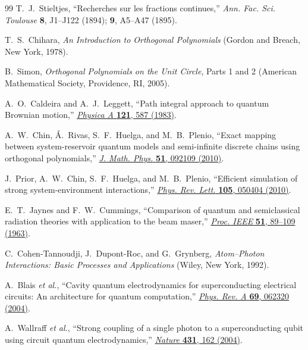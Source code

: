 \documentclass[reprint, floatfix, superscriptaddress, amsmath, amssymb, longbibliography]{revtex4-2}
\begin{document}
\begin{thebibliography}{99}
T.~J.~Stieltjes, ``Recherches sur les fractions continues,''
\textit{Ann. Fac. Sci. Toulouse} \textbf{8}, J1--J122 (1894);
\textbf{9}, A5--A47 (1895).

T.~S.~Chihara,
\textit{An Introduction to Orthogonal Polynomials}
(Gordon and Breach, New York, 1978).

B.~Simon,
\textit{Orthogonal Polynomials on the Unit Circle}, Parts 1 and 2
(American Mathematical Society, Providence, RI, 2005).

A.~O.~Caldeira and A.~J.~Leggett, ``Path integral approach to quantum Brownian motion,''
\href{https://doi.org/10.1016/0378-4371(83)90013-4}{\textit{Physica A} \textbf{121}, 587 (1983)}.

A.~W.~Chin, \'{A}.~Rivas, S.~F.~Huelga, and M.~B.~Plenio,
``Exact mapping between system-reservoir quantum models and semi-infinite discrete chains using orthogonal polynomials,''
\href{https://doi.org/10.1063/1.3490188}{\textit{J. Math. Phys.} \textbf{51}, 092109 (2010)}.

J.~Prior, A.~W.~Chin, S.~F.~Huelga, and M.~B.~Plenio,
``Efficient simulation of strong system-environment interactions,''
\href{https://doi.org/10.1103/PhysRevLett.105.050404}{\textit{Phys. Rev. Lett.} \textbf{105}, 050404 (2010)}.

E.~T.~Jaynes and F.~W.~Cummings, ``Comparison of quantum and semiclassical radiation theories with application to the beam maser,''
\href{https://doi.org/10.1109/PROC.1963.1664}{\textit{Proc. IEEE} \textbf{51}, 89--109 (1963)}.

C.~Cohen-Tannoudji, J.~Dupont-Roc, and G.~Grynberg,
\textit{Atom--Photon Interactions: Basic Processes and Applications}
(Wiley, New York, 1992).

A.~Blais \textit{et al.}, ``Cavity quantum electrodynamics for superconducting electrical circuits: An architecture for quantum computation,'' 
\href{https://doi.org/10.1103/PhysRevA.69.062320}{\textit{Phys. Rev. A} \textbf{69}, 062320 (2004)}.

A.~Wallraff \textit{et al.}, ``Strong coupling of a single photon to a superconducting qubit using circuit quantum electrodynamics,'' 
\href{https://doi.org/10.1038/nature02851}{\textit{Nature} \textbf{431}, 162 (2004)}.


\end{thebibliography}
\end{document}
